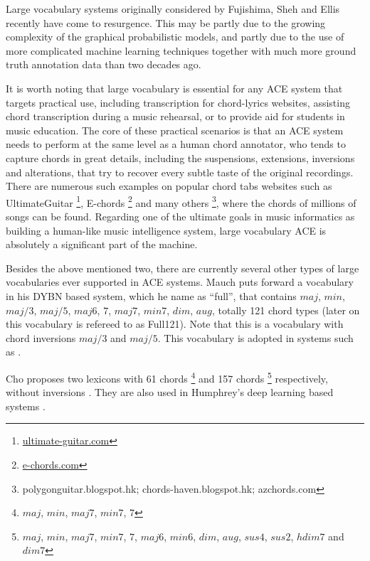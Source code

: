  \label{sec:2-largevocab}
Large vocabulary systems originally considered by Fujishima, Sheh and Ellis \cite{fujishima1999realtime,sheh2003chord} recently have come to resurgence. This may be partly due to the growing complexity of the graphical probabilistic models, and partly due to the use of more complicated machine learning techniques together with much more ground truth annotation data than two decades ago.

It is worth noting that large vocabulary is essential for any ACE system that targets practical use, including transcription for chord-lyrics websites, assisting chord transcription during a music rehearsal, or to provide aid for students in music education. The core of these practical scenarios is that an ACE system needs to perform at the same level as a human chord annotator, who tends to capture chords in great details, including the suspensions, extensions, inversions and alterations, that try to recover every subtle taste of the original recordings. There are numerous such examples on popular chord tabs websites such as UltimateGuitar \footnote{\url{ultimate-guitar.com}}, E-chords \footnote{\url{e-chords.com}} and many others \footnote{polygonguitar.blogspot.hk; chords-haven.blogspot.hk; azchords.com}, where the chords of millions of songs can be found. Regarding one of the ultimate goals in music informatics as building a human-like music intelligence system, large vocabulary ACE is absolutely a significant part of the machine.

Besides the above mentioned two, there are currently several other types of large vocabularies ever supported in ACE systems. Mauch \cite{mauch2010automatic} puts forward a vocabulary in his DYBN based system, which he name as ``full'', that contains $maj$, $min$, $maj/3$, $maj/5$, $maj6$, $7$, $maj7$, $min7$, $dim$, $aug$, totally 121 chord types (later on this vocabulary is refereed to as Full121). Note that this is a vocabulary with chord inversions $maj/3$ and $maj/5$. This vocabulary is adopted in systems such as \cite{ni2012end,mcvicar2014automatic,boulanger2013audio}.

Cho \cite{cho2014improved} proposes two lexicons with 61 chords \footnote{$maj$, $min$, $maj7$, $min7$, $7$} and 157 chords \footnote{$maj$, $min$, $maj7$, $min7$, $7$, $maj6$, $min6$, $dim$, $aug$, $sus4$, $sus2$, $hdim7$ and $dim7$} respectively, without inversions \cite{burgoyne2014comparative}. They are also used in Humphrey's deep learning based systems \cite{humphreyfour,humphrey2015exploration}.

